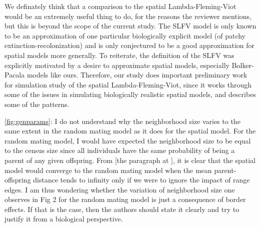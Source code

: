     We definately think that a comparison to the spatial Lambda-Fleming-Viot
    would be an extremely useful thing to do, for the reasons the reviewer mentions,
    but this is beyond the scope of the current study.
    The SLFV model is only known to be an approximation of one particular biologically explicit model
    (of patchy extinction-recolonization)
    and is only conjectured to be a good approximation
    for spatial models more generally.
    To reiterate, the definition of the SLFV was explicitly motivated by a desire to approximate
    spatial models, especially Bolker-Pacala models like ours.
    Therefore, our study does important preliminary work
    for simulation study of the spatial Lambda-Fleming-Viot,
    since it works through some of the issues in simulating biologically realistic spatial models,
    and describes some of the patterns.

\begin{point}{\autoref{fig:genparams}:}
    I do not understand why the neighborhood size varies to the same extent in the random mating model as it does for the spatial model. For the random mating model, I would have expected the neighborhood size to be equal to the census size since all individuals have the same probability of being a parent of any given offspring. From [the paragraph at \revref], it is clear that the spatial model would converge to the random mating model when the mean parent-offspring distance tends to infinity only if we were to ignore the impact of range edges. I am thus wondering whether the variation of neighborhood size one observes in Fig 2 for the random mating model is just a consequence of border effects. If that is the case, then the authors should state it clearly and try to justify it from a biological perspective.
\end{point}


